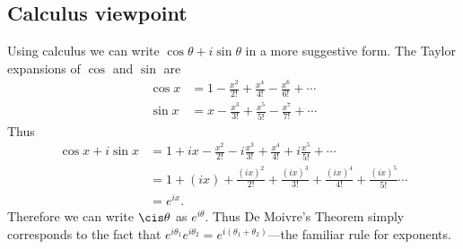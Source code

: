 \subsection{Calculus viewpoint}
Using calculus we can write $\cos \theta+i\sin \theta$ in a more suggestive form. The Taylor expansions of $\cos$ and $\sin$ are
\begin{align*}
\cos x&=1-\frac{x^2}{2!}+\frac{x^4}{4!}-\frac{x^6}{6!}+\cdots\\
\sin x&=x-\frac{x^3}{3!}+\frac{x^5}{5!}-\frac{x^7}{7!}+\cdots
\end{align*}
Thus
\begin{align*}
\cos x+i\sin x&=1+ix-\frac{x^2}{2!}-i\frac{x^3}{3!}+\frac{x^4}{4!}+i\frac{x^5}{5!}+\cdots\\
&=1+(ix)+\frac{(ix)^2}{2!}+\frac{(ix)^3}{3!}+\frac{(ix)^4}{4!}+\frac{(ix)^5}{5!}\cdots\\
&=e^{ix}.
\end{align*}
Therefore we can write $\cis \theta$ as $e^{i\theta}$. Thus De Moivre's Theorem simply corresponds to the fact that $e^{i\theta_1}e^{i\theta_2}=e^{i(\theta_1+\theta_2)}$---the familiar rule for exponents.
